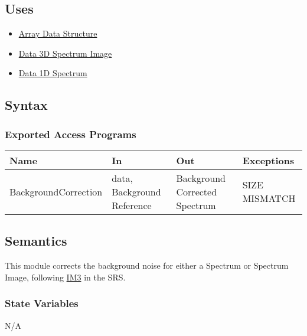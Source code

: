 \documentclass[12pt, titlepage]{article}
\begin{document}
\subsection{Uses}
\begin{itemize}
    \item \hyperref[Mod:Array]{Array Data Structure}
    \item \hyperref[Mod:SI]{Data 3D Spectrum Image}
    \item \hyperref[Mod:Spectrum]{Data 1D Spectrum}
\end{itemize}

\subsection{Syntax}

\subsubsection{Exported Access Programs}
\begin{center}
    \begin{tabular}{p{4cm} p{3.5cm} p{4cm} p{3cm}}
        \hline
        \textbf{Name} & \textbf{In} & \textbf{Out} & \textbf{Exceptions} \\
        \hline
        BackgroundCorrection & data, Background Reference & Background Corrected Spectrum & SIZE MISMATCH \\
        \hline
    \end{tabular}
\end{center}

\subsection{Semantics}
This module corrects the background noise for either a Spectrum or Spectrum Image, following \hyperref[background]{IM3} in the SRS.

\subsubsection{State Variables}
N/A
\end{document}
